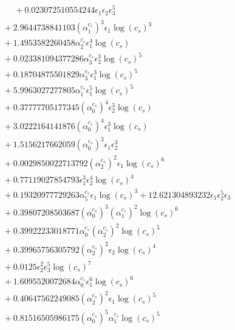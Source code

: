 \documentclass[10pt]{article}
\begin{document}
\begin{align*}
\phantom{F_{s,7}} &\phantom{={}}{}  + 0.023072510554244 \epsilon_{1} \epsilon_{2} \epsilon_{3}^{5} \\
&{}  + 2.9644738841103 \left(\alpha_{1}^{c_s}\right)^{3} \epsilon_{1} \log{\left(c_{s} \right)}^{3} \\
&{}  + 1.4953582260458 \alpha_{2}^{c_s} \epsilon_{1}^{4} \log{\left(c_{s} \right)} \\
&{}  + 0.023381094377286 \alpha_{3}^{c_s} \epsilon_{2}^{3} \log{\left(c_{s} \right)}^{5} \\
&{}  + 0.18704875501829 \alpha_{3}^{c_s} \epsilon_{1}^{3} \log{\left(c_{s} \right)}^{5} \\
&{}  + 5.9963027277805 \alpha_{1}^{c_s} \epsilon_{1}^{5} \log{\left(c_{s} \right)}^{5} \\
&{}  + 0.37777705177345 \left(\alpha_{0}^{c_s}\right)^{4} \epsilon_{2}^{3} \log{\left(c_{s} \right)} \\
&{}  + 3.0222164141876 \left(\alpha_{0}^{c_s}\right)^{4} \epsilon_{1}^{3} \log{\left(c_{s} \right)} \\
&{}  + 1.5156217662059 \left(\alpha_{0}^{c_s}\right)^{3} \epsilon_{1} \epsilon_{2}^{3} \\
&{}  + 0.0029850022713792 \left(\alpha_{2}^{c_s}\right)^{2} \epsilon_{1} \log{\left(c_{s} \right)}^{6} \\
&{}  + 0.77119027854793 \epsilon_{1}^{3} \epsilon_{2}^{4} \log{\left(c_{s} \right)}^{4} \\
&{}  + 0.19320977729263 \alpha_{5}^{c_s} \epsilon_{1} \log{\left(c_{s} \right)}^{3} + 12.621304893232 \epsilon_{1} \epsilon_{2}^{5} \epsilon_{3} \\
&{}  + 0.39807208503687 \left(\alpha_{0}^{c_s}\right)^{3} \left(\alpha_{1}^{c_s}\right)^{2} \log{\left(c_{s} \right)}^{6} \\
&{}  + 0.39922233018771 \alpha_{0}^{c_s} \left(\alpha_{2}^{c_s}\right)^{2} \log{\left(c_{s} \right)}^{5} \\
&{}  + 0.39965756305792 \left(\alpha_{2}^{c_s}\right)^{2} \epsilon_{2} \log{\left(c_{s} \right)}^{4} \\
&{}  + 0.0125 \epsilon_{2}^{2} \epsilon_{3}^{5} \log{\left(c_{s} \right)}^{7} \\
&{}  + 1.6095520072684 \alpha_{0}^{c_s} \epsilon_{1}^{6} \log{\left(c_{s} \right)}^{6} \\
&{}  + 0.40647562249085 \left(\alpha_{2}^{c_s}\right)^{2} \epsilon_{1} \log{\left(c_{s} \right)}^{5} \\
&{}  + 0.81516505986175 \left(\alpha_{0}^{c_s}\right)^{5} \alpha_{1}^{c_s} \log{\left(c_{s} \right)}^{5} \\

\end{align*}
\end{document}
